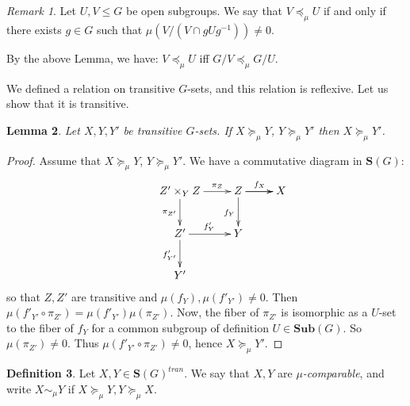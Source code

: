 \documentclass[11pt,a4paper]{amsart}
\theoremstyle{plain}%
\newtheorem{lemma}{Lemma}[subsection]
\theoremstyle{definition}
\newtheorem{definition}[lemma]{Definition}
\theoremstyle{remark}
\newtheorem{remark}[lemma]{Remark}
\newcommand{\Sub}{\mathbf{Sub}}
\begin{document}
\begin{remark}\label{rmk:order_on_subgroups}
      Let $U, V\leq G$ be open subgroups. We say that $V \preceq_\mu U$ if and only if there exists $g\in G$ such that $\mu(V/(V\cap gUg^{-1}))\neq 0$. 
      
      By the above Lemma, we have: $V \preceq_\mu U $ iff $G/V\preceq_\mu G/U$. 
\end{remark}
  


We defined a relation on transitive $G$-sets, and this relation is reflexive. Let us show that it is transitive.

\begin{lemma}
    Let $X, Y, Y'$ be transitive $G$-sets. 
    If $X\succeq_\mu Y$, $Y \succeq_\mu Y'$ then $X\succeq_\mu Y'$.
  
\end{lemma}

\begin{proof}

Assume that $X\succeq_\mu Y$, $Y \succeq_\mu Y'$.
We have a commutative diagram in $\mathbf{S}(G)$:
$$\xymatrix{&Z'\times_Y Z \ar_{\pi_{Z'}}[d]\ar^-{\pi_Z}[r] &Z \ar_{f_Y}[d]\ar^{f_X}[r] \ar[r] &X\\
&Z' \ar_{f'_{Y'}}[d]\ar^{f'_Y}[r] &Y & \\
&Y' & &}$$
so that $Z, Z'$ are transitive and $\mu(f_Y), \mu(f'_{Y'})\neq 0$.
Then $\mu(f'_{Y'}\circ \pi_{Z'}) = \mu(f'_{Y'})\mu( \pi_{Z'})$. Now, the fiber of $  \pi_{Z'} $ is isomorphic as a $U$-set to the fiber of $f_Y$ for a common subgroup of definition $U\in \Sub(G)$. So  $\mu( \pi_{Z'}) \neq 0$. Thus $\mu(f'_{Y'}\circ \pi_{Z'})\neq 0$, hence $X\succeq_\mu Y'$.
      
\end{proof}


\begin{definition}
    Let $X, Y\in \mathbf{S}(G)^{tran}$. We say that $X, Y$ are \emph{$\mu$-comparable}, and write $X\sim_{\mu}Y$ if $X\succeq_\mu Y, Y\succeq_\mu X$. 
    
\end{definition}
\end{document}

